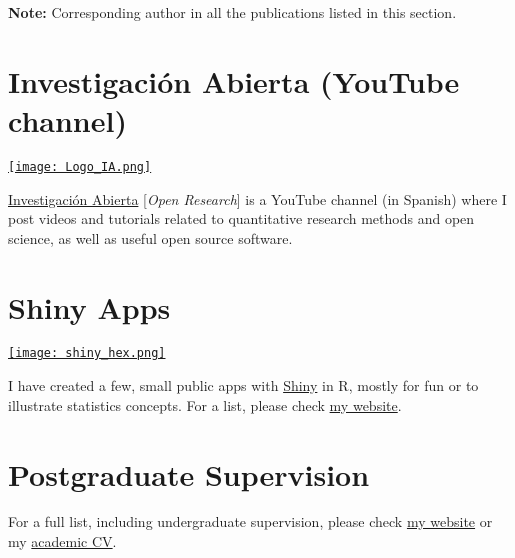 \documentclass[11pt,a4paper,]{awesome-cv}
\begin{document}
\endgroup

\begin{footnotesize}
\textbf{Note:} Corresponding author in all the publications listed in this section.
\end{footnotesize}

\hypertarget{investigaciuxf3n-abierta-youtube-channel}{%
\section{Investigación Abierta (YouTube
channel)}\label{investigaciuxf3n-abierta-youtube-channel}}

\begin{minipage}[c]{0.15\linewidth}
\href{https://www.youtube.com/@InvestigacionAbierta}{\texttt{[image: Logo\_IA.png]}}
\end{minipage} \begin{minipage}[c]{0.85\linewidth}
\textcolor{red}{\faYoutube} \href{https://www.youtube.com/@InvestigacionAbierta}{Investigación Abierta} [\textit{Open Research}] is a YouTube channel (in Spanish) where I post videos and tutorials related to quantitative research methods and open science, as well as useful open source software.
\end{minipage}

\hypertarget{shiny-apps}{%
\section{Shiny Apps}\label{shiny-apps}}

\begin{minipage}[c]{0.10\linewidth}
\href{https://jdleongomez.info/en/#shiny}{\texttt{[image: shiny\_hex.png]}}
\end{minipage} \begin{minipage}[c]{0.90\linewidth}
I have created a few, small public apps with \href{https://shiny.posit.co/}{Shiny} in R, mostly for fun or to illustrate statistics concepts. For a list, please check \href{https://jdleongomez.info/en/#shiny}{my website}.
\end{minipage}

\hypertarget{postgraduate-supervision}{%
\section{Postgraduate Supervision}\label{postgraduate-supervision}}

For a full list, including undergraduate supervision, please check
\href{https://jdleongomez.info/en/team/}{my website} or my
\href{https://jdleongomez.info/en/files/jdl_cv_en.pdf}{academic CV}.
\end{document}
